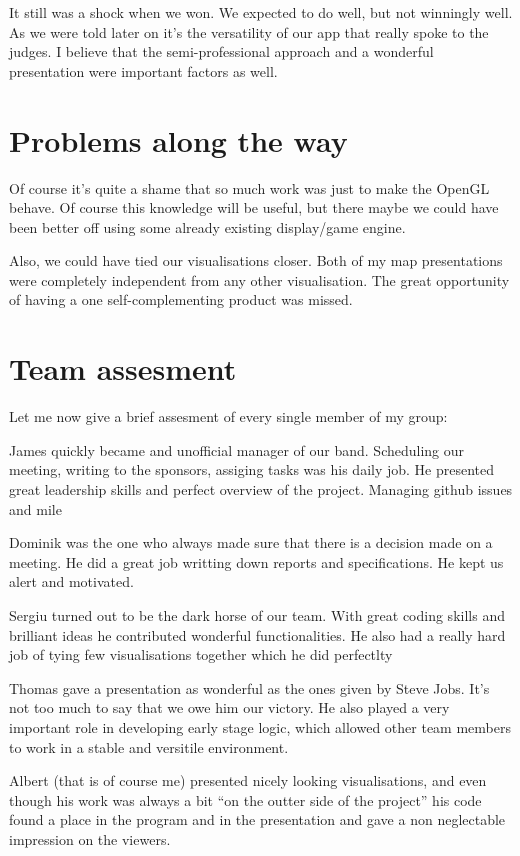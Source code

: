 \documentclass[12pt,a4paper]{article}
\begin{document}
                It still was a shock when we won. We expected to do well, but not winningly well. As we were told later on it's the versatility of our app that really spoke to the judges. I believe that the semi-professional approach and a wonderful presentation were important factors as well.

    
	\section*{Problems along the way}

        Of course it's quite a shame that so much work was just to make the OpenGL behave. Of course this knowledge will be useful, but there maybe we could have been better off using some already existing display/game engine.
        
        Also, we could have tied our visualisations closer. Both of my map presentations were completely independent from any other visualisation. The great opportunity of having a one self-complementing product was missed.

	\section*{Team assesment}
		Let me now give a brief assesment of every single member of my group:
		
                James quickly became and unofficial manager of our band. Scheduling our meeting, writing to the sponsors, assiging tasks was his daily job. He presented great leadership skills and perfect overview of the project. Managing github issues and mile
		
		Dominik was the one who always made sure that there is a decision made on a meeting. He did a great job writting down reports and specifications. He kept us alert and motivated.
		
		Sergiu turned out to be the dark horse of our team. With great coding skills and brilliant ideas he contributed wonderful functionalities. He also had a really hard job of tying few visualisations together which he did perfectlty
		
		Thomas gave a presentation as wonderful as the ones given by Steve Jobs. It's not too much to say that we owe him our victory. He also played a very important role in developing early stage logic, which allowed other team members to work in a stable and versitile environment.
		
		Albert (that is of course me) presented nicely looking visualisations, and even though his work was always a bit ``on the outter side of the project'' his code found a place in the program and in the presentation and gave a non neglectable impression on the viewers.
\end{document}
